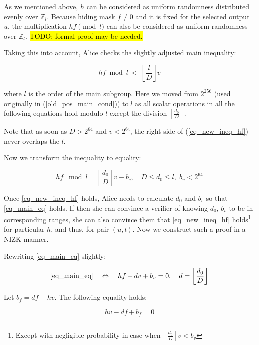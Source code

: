 \documentclass{article}
\newcommand{\floor}[1]{\left\lfloor #1 \right\rfloor}
\numberwithin{figure}{section}
\begin{document}
As we mentioned above, $h$ can be considered as uniform randomness distributed evenly over $\mathbb{Z}_l$. Because hiding mask $f \neq 0$ and it is fixed for the selected output $u$, the multiplication $hf \pmod{l}$ can also be considered as uniform randomness over $\mathbb{Z}_l$. \hl{TODO: formal proof may be needed.}

Taking this into account, Alice checks the slightly adjusted main inequality:

\begin{equation} \label{eq_new_ineq_hf}
    hf \bmod{l} \; < \; \floor{\frac{l}{D}}v
\end{equation}

where $l$ is the order of the main subgroup. Here we moved from $2^{256}$ (used originally in (\ref{old_pos_main_cond})) to $l$ as all scalar operations in all the following equations hold modulo $l$ except the division $\floor{\frac{d_0}{D}}$.

Note that as soon as $D > 2^{64}$ and $v < 2^{64}$, the right side of (\ref{eq_new_ineq_hf}) never overlaps the $l$.

Now we transform the inequality to equality:

\begin{equation} \label{eq_main_eq}
    hf \; \bmod l = \floor{\frac{d_0}{D}} v - b_v, \quad D \leq d_0 \leq l, \; b_v < 2^{64}
\end{equation}

Once \eqref{eq_new_ineq_hf} holds, Alice needs to calculate $d_0$ and $b_v$ so that \eqref{eq_main_eq} holds. If then she can convince a verifier of knowing $d_0$, $b_v$ to be in corresponding ranges, she can also convince them that \eqref{eq_new_ineq_hf} holds\footnote{Except with negligible probability in case when $\floor{\frac{d_0}{D}}v < b_v$} for particular $h$, and thus, for pair $(u, t)$. Now we construct such a proof in a NIZK-manner.

Rewriting \eqref{eq_main_eq} slightly:

\begin{equation} \label{eq_part_g}
    \eqref{eq_main_eq} \quad \Leftrightarrow \quad hf - dv + b_v = 0, \quad d = \floor{\frac{d_0}{D}}
\end{equation}

Let $b_f = df - hv$. The following equality holds:

\begin{equation} \label{eq_part_h}
    hv - df + b_f = 0
\end{equation}
\end{document}
